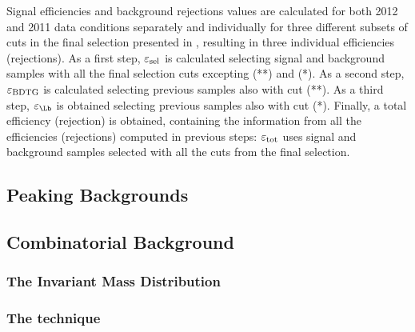 Signal efficiencies and background rejections values are calculated for both 2012 and 2011 data conditions separately and individually for three 
different subsets of cuts in the final selection presented in , resulting in three individual efficiencies (rejections). 
As a first step, $\varepsilon_{\rm sel}$ is calculated selecting signal and background samples with all the final selection cuts excepting (**) and (*). 
As a second step, $\varepsilon_{\rm BDTG}$ is calculated selecting previous samples also with cut (**). As a third step, $\varepsilon_{\Lb}$ is obtained 
selecting previous samples also with cut (*). Finally, a total efficiency (rejection) is obtained, containing the information from all the efficiencies 
(rejections) computed in previous steps: $\varepsilon_{\rm tot}$ uses signal and background samples selected with all the cuts from the final selection.


\subsection{Peaking Backgrounds}

\subsection{Combinatorial Background}

\subsubsection{The \BJpsiKpi Invariant Mass Distribution}
\label{The_Invariant_Mass_Distribution}

\subsubsection{The \sPlot technique}

